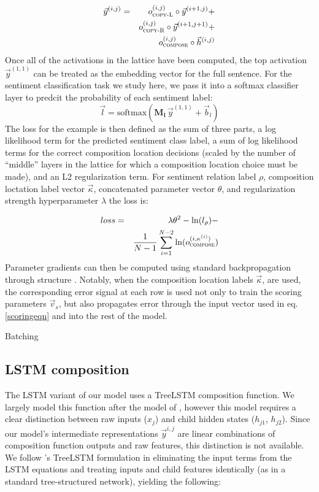 \begin{eqnarray}
\vec{y}^{(i,j)} & = & o^{(i, j)}_{\textsc{copy-L}} \circ \vec{y}^{(i + 1, j)} +\\
&&\nonumber o^{(i, j)}_{\textsc{copy-R}} \circ \vec{y}^{(i + 1, j + 1)} +\\
&&\nonumber o^{(i, j)}_{\textsc{compose}} \circ \vec{h}^{(i, j)}
\end{eqnarray}
%
Once all of the activations in the lattice have been computed, the top activation $\vec{y}^{(1,1)}$ can be treated as the embedding vector for the full sentence. For the sentiment classification task we study here, we pass it into a softmax classifier layer to predcit the probability of each sentiment label:
%
\begin{equation}
\vec{l} = \text{softmax}(\mathbf{M_l}\,\vec{y}^{(1, 1)} + \vec{b}_l)
\end{equation}
%
The loss for the example is then defined as the sum of three parts, a log likelihood term for the predicted sentiment class label, a sum of log likelihood terms for the correct composition location decisions (scaled by the number of ``middle'' layers in the lattice for which a composition location choice must be made), and an L2 regularization term. For sentiment relation label $\rho$, composition loctation label vector $\vec{\kappa}$, concatenated parameter vector $\theta$, and regularization strength hyperparameter $\lambda$ the loss is:
%

\begin{eqnarray}
loss & = & \lambda\theta^2 - \ln(l_\rho) -\\
\nonumber&&\frac{1}{N - 1} \sum_{i = 1}^{N - 2} \ln(o^{(i,\kappa^{(i)})}_{\textsc{compose}})
\end{eqnarray}
%
Parameter gradients can then be computed using standard backpropagation through structure \cite{goller1996learning}. Notably, when the composition location labels $\vec{\kappa}$, are used, the corresponding error signal at each row is used not only to train the scoring parameters $\vec{v}_s$, but also propagates error through the input vector used in eq. \ref{scoringeqn} and into the rest of the model.

Batching

\subsection{LSTM composition}

The LSTM variant of our model uses a TreeLSTM composition function. We largely model this function after the model of , however this model requires a clear distinction between raw inputs ($x_j$) and child hidden states ($h_{j1}$, $h_{j2}$). Since our model's intermediate representations $\vec{y}^{i,j}$ are linear combinations of composition function outputs and raw features, this distinction is not available. We follow 's TreeLSTM formulation in eliminating the input terms from the LSTM equations and treating inputs and child features identically (as in a standard tree-structured network), yielding the following:

